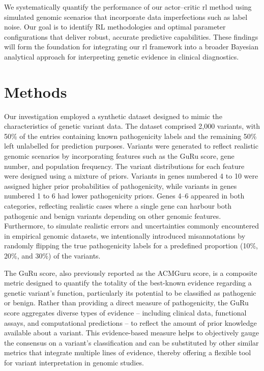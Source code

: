 We systematically quantify the performance of our actor–critic \ac{rl} method using simulated genomic scenarios that incorporate data imperfections such as label noise. Our goal is to identify RL methodologies and optimal parameter configurations that deliver robust, accurate predictive capabilities. These findings will form the foundation for integrating our \ac{rl} framework into a broader Bayesian analytical approach for interpreting genetic evidence in clinical diagnostics.

\section{Methods}  
Our investigation employed a synthetic dataset designed to mimic the characteristics of genetic variant data. The dataset comprised 2,000 variants, with 50\% of the entries containing known pathogenicity labels and the remaining 50\% left unlabelled for prediction purposes. Variants were generated to reflect realistic genomic scenarios by incorporating features such as the GuRu score, gene number, and population frequency. 
The variant distributions for each feature were designed using a mixture of priors. Variants in genes numbered 4 to 10 were assigned higher prior probabilities of pathogenicity, while variants in genes numbered 1 to 6 had lower pathogenicity priors. Genes 4–6 appeared in both categories, reflecting realistic cases where a single gene can harbour both pathogenic and benign variants depending on other genomic features.
Furthermore, to simulate realistic errors and uncertainties commonly encountered in empirical genomic datasets, we intentionally introduced misannotations by randomly flipping the true pathogenicity labels for a predefined proportion (10\%, 20\%, and 30\%) of the variants.

The GuRu score, also previously reported as the ACMGuru score, is a composite metric designed to quantify the totality of the best-known evidence regarding a genetic variant's function, particularly its potential to be classified as pathogenic or benign. Rather than providing a direct measure of pathogenicity, the GuRu score aggregates diverse types of evidence -- including clinical data, functional assays, and computational predictions -- to reflect the amount of prior knowledge available about a variant. This evidence-based measure helps to objectively gauge the consensus on a variant’s classification and can be substituted by other similar metrics that integrate multiple lines of evidence, thereby offering a flexible tool for variant interpretation in genomic studies.

